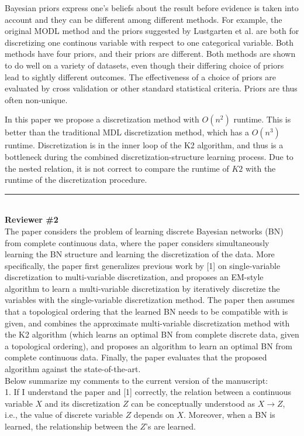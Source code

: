 \documentclass{article}
\begin{document}
Bayesian priors express one's beliefs about the result before evidence is taken into account and they can be different among different methods.
For example, the original MODL method and the priors suggested by Lustgarten et al. are both for discretizing one continous variable with respect to one categorical variable.
Both methods have four priors, and their priors are different.
Both methods are shown to do well on a variety of datasets, even though their differing choice of priors lead to sightly different outcomes.
The effectiveness of a choice of priors are evaluated by cross validation or other standard statistical criteria.
Priors are thus often non-unique.

In this paper we propose a discretization method with $O(n^2)$ runtime.
This is better than the traditional MDL discretization method, which has a $O(n^3)$ runtime.
Discretization is in the inner loop of the K2 algorithm, and thus is a bottleneck during the combined discretization-structure learning process.
Due to the nested relation, it is not correct to compare the runtime of $K2$ with the runtime of the discretization procedure.

\noindent\rule{8cm}{0.4pt}\\
{\bf Reviewer \#2} \\

 The paper considers the problem of learning discrete Bayesian networks (BN) from complete continuous data, where the paper considers simultaneously learning the BN structure and learning the discretization of the data. More specifically, the paper first generalizes previous work by [1] on single-variable discretization to multi-variable discretization, and proposes an EM-style algorithm to learn a multi-variable discretization by iteratively discretize the variables with the single-variable discretization method. The paper then assumes that a topological ordering that the learned BN needs to be compatible with is given, and combines the approximate multi-variable discretization method with the K2 algorithm (which learns an optimal BN from complete discrete data, given a topological ordering), and proposes an algorithm to learn an optimal BN from complete continuous data. Finally, the paper evaluates that the proposed algorithm against the state-of-the-art.\\

 Below summarize my comments to the current version of the manuscript:\\

1. If I understand the paper and [1] correctly, the relation between a continuous variable $X$ and its discretization $Z$ can be conceptually
understood as $X \rightarrow Z$, i.e., the value of discrete variable $Z$ depends on $X$. Moreover, when a BN is learned, the relationship between the $Z$'s are learned.
\end{document}
